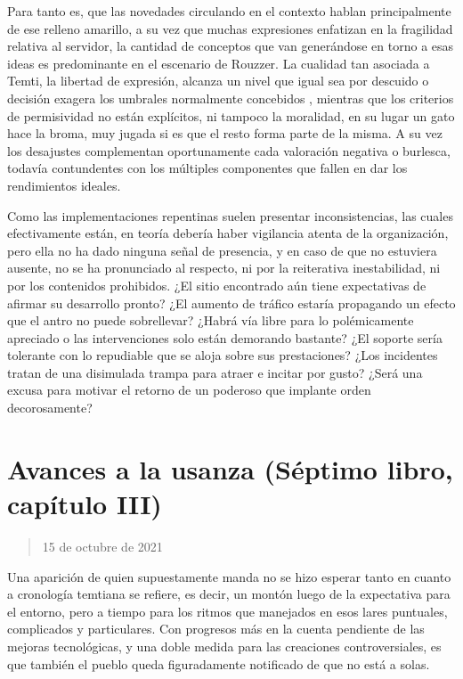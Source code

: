 \documentclass[
]{book}
\begin{document}
Para tanto es, que las novedades circulando en el contexto hablan principalmente de ese relleno amarillo, a su vez que muchas expresiones enfatizan en la fragilidad relativa al servidor, la cantidad de conceptos que van generándose en torno a esas ideas es predominante en el escenario de Rouzzer. La cualidad tan asociada a Temti, la libertad de expresión, alcanza un nivel que igual sea por descuido o decisión exagera los umbrales normalmente concebidos , mientras que los criterios de permisividad no están explícitos, ni tampoco la moralidad, en su lugar un gato hace la broma, muy jugada si es que el resto forma parte de la misma. A su vez los desajustes complementan oportunamente cada valoración negativa o burlesca, todavía contundentes con los múltiples componentes que fallen en dar los rendimientos ideales.

Como las implementaciones repentinas suelen presentar inconsistencias, las cuales efectivamente están, en teoría debería haber vigilancia atenta de la organización, pero ella no ha dado ninguna señal de presencia, y en caso de que no estuviera ausente, no se ha pronunciado al respecto, ni por la reiterativa inestabilidad, ni por los contenidos prohibidos. ¿El sitio encontrado aún tiene expectativas de afirmar su desarrollo pronto? ¿El aumento de tráfico estaría propagando un efecto que el antro no puede sobrellevar? ¿Habrá vía libre para lo polémicamente apreciado o las intervenciones solo están demorando bastante? ¿El soporte sería tolerante con lo repudiable que se aloja sobre sus prestaciones? ¿Los incidentes tratan de una disimulada trampa para atraer e incitar por gusto? ¿Será una excusa para motivar el retorno de un poderoso que implante orden decorosamente?

\hypertarget{avances-a-la-usanza-suxe9ptimo-libro-capuxedtulo-iii}{%
\section{Avances a la usanza (Séptimo libro, capítulo III)}\label{avances-a-la-usanza-suxe9ptimo-libro-capuxedtulo-iii}}

\begin{quote}
15 de octubre de 2021
\end{quote}

Una aparición de quien supuestamente manda no se hizo esperar tanto en cuanto a cronología temtiana se refiere, es decir, un montón luego de la expectativa para el entorno, pero a tiempo para los ritmos que manejados en esos lares puntuales, complicados y particulares. Con progresos más en la cuenta pendiente de las mejoras tecnológicas, y una doble medida para las creaciones controversiales, es que también el pueblo queda figuradamente notificado de que no está a solas.
\end{document}
